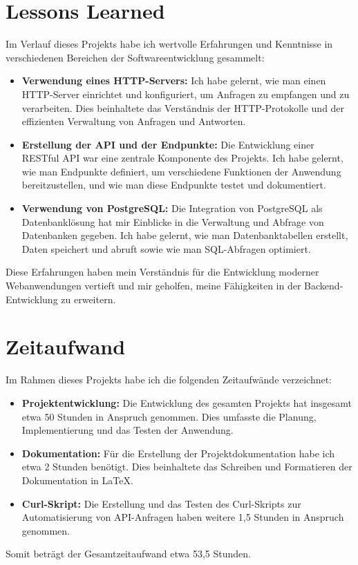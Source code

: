 \documentclass{article}
\begin{document}
\section{Lessons Learned}

Im Verlauf dieses Projekts habe ich wertvolle Erfahrungen und Kenntnisse in verschiedenen Bereichen der Softwareentwicklung gesammelt:

\begin{itemize}
    \item \textbf{Verwendung eines HTTP-Servers:} Ich habe gelernt, wie man einen HTTP-Server einrichtet und konfiguriert, um Anfragen zu empfangen und zu verarbeiten. Dies beinhaltete das Verständnis der HTTP-Protokolle und der effizienten Verwaltung von Anfragen und Antworten.

    \item \textbf{Erstellung der API und der Endpunkte:} Die Entwicklung einer RESTful API war eine zentrale Komponente des Projekts. Ich habe gelernt, wie man Endpunkte definiert, um verschiedene Funktionen der Anwendung bereitzustellen, und wie man diese Endpunkte testet und dokumentiert.

    \item \textbf{Verwendung von PostgreSQL:} Die Integration von PostgreSQL als Datenbanklösung hat mir Einblicke in die Verwaltung und Abfrage von Datenbanken gegeben. Ich habe gelernt, wie man Datenbanktabellen erstellt, Daten speichert und abruft sowie wie man SQL-Abfragen optimiert.

\end{itemize}

Diese Erfahrungen haben mein Verständnis für die Entwicklung moderner Webanwendungen vertieft und mir geholfen, meine Fähigkeiten in der Backend-Entwicklung zu erweitern.

\section{Zeitaufwand}

Im Rahmen dieses Projekts habe ich die folgenden Zeitaufwände verzeichnet:

\begin{itemize}
    \item \textbf{Projektentwicklung:} Die Entwicklung des gesamten Projekts hat insgesamt etwa 50 Stunden in Anspruch genommen. Dies umfasste die Planung, Implementierung und das Testen der Anwendung.

    \item \textbf{Dokumentation:} Für die Erstellung der Projektdokumentation habe ich etwa 2 Stunden benötigt. Dies beinhaltete das Schreiben und Formatieren der Dokumentation in LaTeX.

    \item \textbf{Curl-Skript:} Die Erstellung und das Testen des Curl-Skripts zur Automatisierung von API-Anfragen haben weitere 1,5 Stunden in Anspruch genommen.

\end{itemize}

Somit beträgt der Gesamtzeitaufwand etwa 53,5 Stunden.
\end{document}
